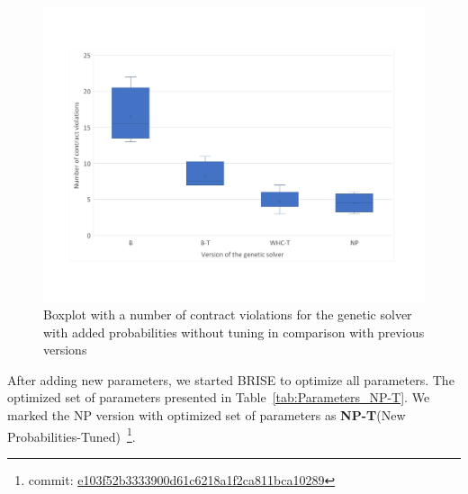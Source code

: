 \begin{figure}
	\centering
	\includegraphics[width=\textwidth]{images/BoxPlotSolverNewParameters.pdf}
	\caption[Boxplot with a number of contract violations for the genetic solver with added probabilities without tuning in comparison with previous versions]{Boxplot with a number of contract violations for the genetic solver with added probabilities without tuning in comparison with previous versions}
	\label{fig:boxplotsolverNewParameters}
\end{figure}

After adding new parameters, we started BRISE to optimize all parameters. The optimized set of parameters presented in Table~\ref{tab:Parameters_NP-T}. We marked the NP version with optimized set of parameters as \textbf{NP-T}(New Probabilities-Tuned)~\footnote{commit: \href{https://git-st.inf.tu-dresden.de/mquat/mquat2/commit/e103f52b3333900d61c6218a1f2ca811bca10289}{e103f52b3333900d61c6218a1f2ca811bca10289}}.

